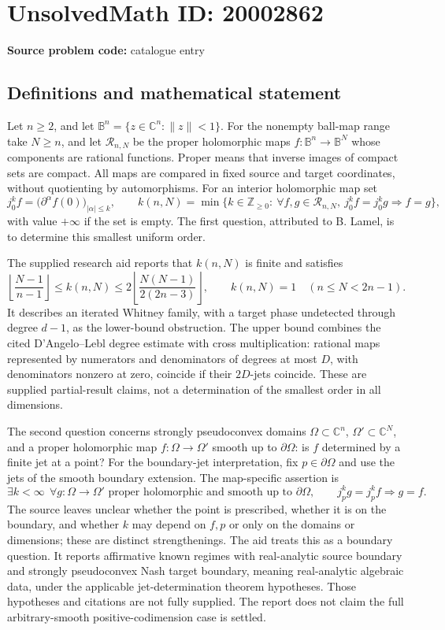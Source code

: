 \documentclass[11pt]{article}
\newcommand{\Z}{\mathbb{Z}}
\newcommand{\C}{\mathbb{C}}
\begin{document}
\section*{UnsolvedMath ID: 20002862}
\textbf{Source problem code:} catalogue entry
\subsection{Definitions and mathematical statement}
Let \(n\ge2\), and let \(\mathbb B^n=\{z\in\C^n:\|z\|<1\}\). For the nonempty ball-map range take \(N\ge n\), and let \(\mathcal R_{n,N}\) be the proper holomorphic maps \(f:\mathbb B^n\to\mathbb B^N\) whose components are rational functions. Proper means that inverse images of compact sets are compact. All maps are compared in fixed source and target coordinates, without quotienting by automorphisms. For an interior holomorphic map set
\[
j^k_0 f=\bigl(\partial^\alpha f(0)\bigr)_{|\alpha|\le k},\qquad
k(n,N)=\min\{k\in\Z_{\ge0}:\ \forall f,g\in\mathcal R_{n,N},\ j^k_0 f=j^k_0g\Longrightarrow f=g\},
\]
with value \(+\infty\) if the set is empty. The first question, attributed to B. Lamel, is to determine this smallest uniform order.

The supplied research aid reports that \(k(n,N)\) is finite and satisfies
\[
\left\lfloor\frac{N-1}{n-1}\right\rfloor
\le k(n,N)\le
2\left\lfloor\frac{N(N-1)}{2(2n-3)}\right\rfloor,
\qquad
k(n,N)=1\quad(n\le N<2n-1).
\]
It describes an iterated Whitney family, with a target phase undetected through degree \(d-1\), as the lower-bound obstruction. The upper bound combines the cited D'Angelo--Lebl degree estimate with cross multiplication: rational maps represented by numerators and denominators of degrees at most \(D\), with denominators nonzero at zero, coincide if their \(2D\)-jets coincide. These are supplied partial-result claims, not a determination of the smallest order in all dimensions.

The second question concerns strongly pseudoconvex domains \(\Omega\subset\C^n\), \(\Omega'\subset\C^N\), and a proper holomorphic map \(f:\Omega\to\Omega'\) smooth up to \(\partial\Omega\): is \(f\) determined by a finite jet at a point? For the boundary-jet interpretation, fix \(p\in\partial\Omega\) and use the jets of the smooth boundary extension. The map-specific assertion is
\[
\exists k<\infty\ \ \forall g:\Omega\to\Omega'\text{ proper holomorphic and smooth up to }\partial\Omega,
\qquad j_p^k g=j_p^k f\Longrightarrow g=f.
\]
The source leaves unclear whether the point is prescribed, whether it is on the boundary, and whether \(k\) may depend on \(f,p\) or only on the domains or dimensions; these are distinct strengthenings. The aid treats this as a boundary question. It reports affirmative known regimes with real-analytic source boundary and strongly pseudoconvex Nash target boundary, meaning real-analytic algebraic data, under the applicable jet-determination theorem hypotheses. Those hypotheses and citations are not fully supplied. The report does not claim the full arbitrary-smooth positive-codimension case is settled.
\end{document}
